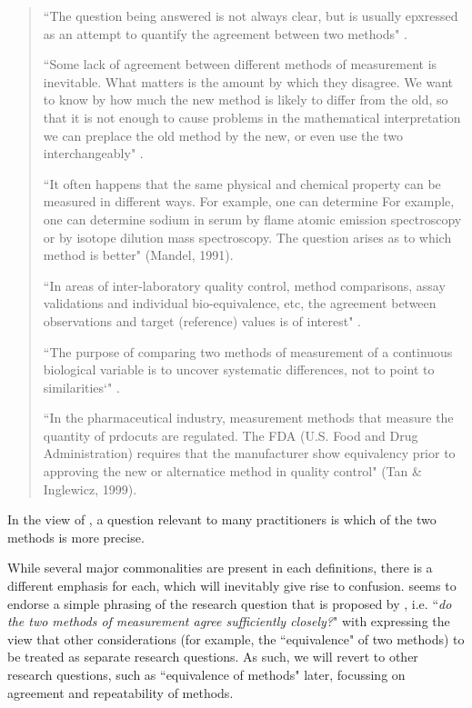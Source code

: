 \documentclass[12pt, a4paper]{report}
\theoremstyle{plain}
\theoremstyle{definition}
\theoremstyle{remark}
\begin{document}
	\begin{quote}
		``The question being answered is not always clear, but is usually epxressed as an attempt to quantify the agreement
		between two methods" \citep{BA95}.
		
		``Some lack of agreement between different methods of measurement is inevitable. What matters is the amount by which they disagree. We want to know by how much the new method is likely to differ from the old, so that it is not enough to cause problems in the mathematical interpretation we can preplace the old method by the new, or even use the two interchangeably" \citep{BA99}.
		
		
		``It often happens that the same physical and chemical property can be measured in different ways. For example, one can determine For example, one can determine sodium in serum by flame atomic emission spectroscopy or by isotope dilution mass spectroscopy. The question arises as to which method is better" (Mandel, 1991).
		
		``In areas of inter-laboratory quality control, method comparisons, assay validations and individual bio-equivalence, etc, the agreement between observations and target (reference) values is
		of interest" \citep{lin2002}.
		
		``The purpose of comparing two methods of measurement of a continuous biological variable is to uncover systematic differences, not to point to
		similarities`" \citep{ludbrook97}.
		
		``In the pharmaceutical industry, measurement methods that measure the quantity of prdocuts are regulated. The FDA (U.S. Food and Drug Administration) requires that the manufacturer show equivalency prior to approving the new or alternatice method in quality control" (Tan \& Inglewicz, 1999). 
	\end{quote}
	In the view of \citet{DunnSEME}, a question relevant to many practitioners is which of the two methods is more precise.
	 
	While several major commonalities are present in each definitions, there is a different emphasis for each, which will inevitably give rise to confusion. \citet{BXC2010} seems to endorse a simple phrasing of the research question that is proposed by \citet{BA83}, i.e. ``\textit{do the two methods of measurement agree sufficiently closely?}" with \citet{BXC2010} expressing the view that other considerations (for example, the ``equivalence" of two methods) to be treated as separate research questions. As such, we will revert to other research questions, such as ``equivalence of methods" later, focussing on agreement and repeatability of methods.
	
\end{document}
